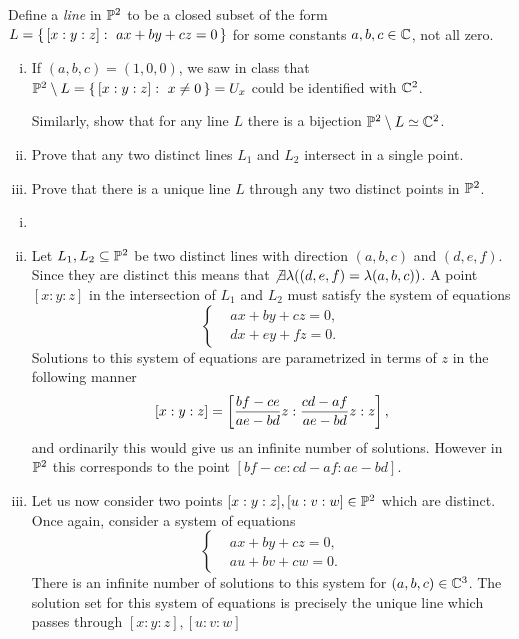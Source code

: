 \documentclass[12pt]{memoir}
\begin{document}
\begin{Ej}
 Define a \emph{line} in $\mathbb{P}^2$ to be a closed subset of the form $L=\{\,[x:y:z]:\ ax+by+cz=0\,\}$ for some constants $a,b,c\in\mathbb{C}$, not all zero.
 \begin{enumerate}[i)]
  \itemsep=-0.4em
  \item If $(a,b,c)=(1,0,0)$, we saw in class that $\mathbb{P}^2\setminus L=\{\,[x:y:z]:\ x\neq 0\,\}=U_x$ could be identified with $\mathbb{C}^2$.\par 
  Similarly, show that for any line $L$ there is a bijection $\mathbb{P}^2\setminus L\simeq \mathbb{C}^2$.
  \item Prove that any two distinct lines $L_1$ and $L_2$ intersect in a single point.
  \item Prove that there is a unique line $L$ through any two distinct points in $\mathbb{P}^2$.
 \end{enumerate}
\end{Ej}

\begin{ptcbr}
  \begin{enumerate}[i)]
    \itemsep=-0.4em
    \item {}
    \item Let $L_1,L_2\subseteq\mathbb{P}^2$ be two distinct lines with direction $(a,b,c)$ and $(d,e,f)$. Since they are distinct this means that $\not\exists\lambda((d,e,f)=\lambda(a,b,c))$. A point $[x:y:z]$ in the intersection of $L_1$ and $L_2$ must satisfy the system of equations
    $$
    \left\lbrace
    \begin{aligned}
      &ax+by+cz=0,\\
      &dx+ey+fz=0.
    \end{aligned}
    \right.
    $$
    Solutions to this system of equations are parametrized in terms of $z$ in the following manner
    $$[x:y:z]=\left\lbrack\frac{bf-ce}{ae-bd}z:\frac{cd-af}{ae-bd}z:z\right\rbrack,$$
    and ordinarily this would give us an infinite number of solutions. However in $\mathbb{P}^2$ this corresponds to the point $[bf-ce:cd-af:ae-bd]$.
    \item Let us now consider two points $[x:y:z],[u:v:w]\in\mathbb{P}^2$ which are distinct. Once again, consider a system of equations 
    $$
    \left\lbrace
    \begin{aligned}
      &ax+by+cz=0,\\
      &au+bv+cw=0.
    \end{aligned}
    \right.
    $$
    There is an infinite number of solutions to this system for $(a,b,c)\in\mathbb{C}^3$. The solution set for this system of equations is precisely the unique line which passes through $[x:y:z],[u:v:w]$
  \end{enumerate}
  \end{ptcbr}
\end{document}
